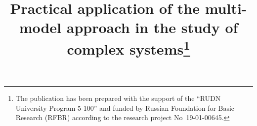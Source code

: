 \title{Practical application of the multi-model approach in the study
of complex systems\thanks{The publication has been prepared with the
support of the ``RUDN University Program 5-100'' and funded by Russian
Foundation for Basic Research (RFBR) according to the research project
No~19-01-00645.}}


